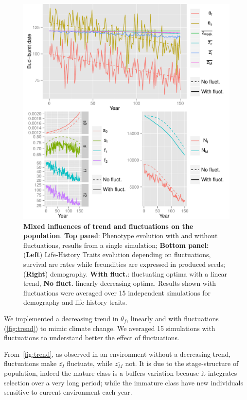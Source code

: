 \begin{figure}[ht!]
	\centering
	\includegraphics[scale=1]{Figures/Trend.pdf}
	\caption{\textbf{Mixed influences of trend and fluctuations on the population}. \textbf{Top panel}: Phenotype evolution with and without fluctuations, results from a single simulation; \textbf{Bottom panel:} (\textbf{Left}) Life-History Traits evolution depending on fluctuations, survival are rates while fecundities are expressed in produced seeds; (\textbf{Right}) demography. \textbf{With fluct.}: fluctuating optima with a linear trend, \textbf{No fluct.} linearly decreasing optima. Results shown with fluctuations were averaged over 15 independent simulations for demography and life-history traits.}
	\label{fig:trend}
\end{figure}

We implemented a decreasing trend in $\theta_f$, linearly and with fluctuations (\autoref{fig:trend}) to mimic climate change. We averaged 15 simulations with fluctuations to understand better the effect of fluctuations.

From~\autoref{fig:trend}, as observed in an environment without a decreasing trend, fluctuations make $\overline{z_I}$ fluctuate, while $\overline{z_M}$ not. It is due to the stage-structure of population, indeed the mature class is a buffers variation because it integrates selection over a very long period; while the immature class have new individuals sensitive to current environment each year.

